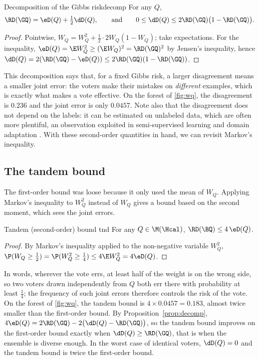 \begin{proposition}{Decomposition of the Gibbs risk}{decomp}
For any $Q$,
\[
\RD(\GQ)=\eD(Q)+\tfrac12\dD(Q),\qquad\text{and}\qquad
0\leq\dD(Q)\leq2\RD(\GQ)\big(1-\RD(\GQ)\big).
\]
\end{proposition}
\begin{proof}
Pointwise, $W_Q=W_Q^2+\frac12\cdot2W_Q(1-W_Q)$; take expectations. For the
inequality, $\eD(Q)=\E W_Q^2\geq(\E W_Q)^2=\RD(\GQ)^2$ by Jensen's inequality, hence
$\dD(Q)=2(\RD(\GQ)-\eD(Q))\leq2\RD(\GQ)(1-\RD(\GQ))$.
\end{proof}

This decomposition says that, for a fixed Gibbs risk, a larger disagreement
means a smaller joint error: the voters make their mistakes on \emph{different}
examples, which is exactly what makes a vote effective. On the forest of
\cref{fig:wq}, the disagreement is $0.236$ and the joint error is only
$0.0457$. Note also that the disagreement does not depend on the labels: it can
be estimated on unlabeled data, which are often more plentiful, an observation
exploited in semi-supervised learning and domain adaptation
\citep{germain2020pac}. With these second-order quantities in hand, we can
revisit Markov's inequality.

\subsection{The tandem bound}

The first-order bound was loose because it only used the mean of $W_Q$.
Applying Markov's inequality to $W_Q^2$ instead of $W_Q$ gives a bound based on
the second moment, which sees the joint errors.

\begin{theorem}{Tandem (second-order) bound \citep{masegosa2020second}}{tnd}
For any $Q\in\M(\Hcal)$, $\RD(\BQ)\leq4\,\eD(Q)$.
\end{theorem}
\begin{proof}
By Markov's inequality applied to the non-negative variable $W_Q^2$,
$\P(W_Q\geq\frac12)=\P(W_Q^2\geq\frac14)\leq4\E W_Q^2=4\eD(Q)$.
\end{proof}

In words, wherever the vote errs, at least half of the weight is on the wrong
side, so two voters drawn independently from $Q$ both err there with probability
at least $\frac14$; the frequency of such joint errors therefore controls the
risk of the vote. On the forest of
\cref{fig:wq}, the tandem bound is $4\times0.0457=0.183$, almost twice smaller
than the first-order bound. By Proposition~\ref{prop:decomp},
$4\eD(Q)=2\RD(\GQ)-2\big(\dD(Q)-\RD(\GQ)\big)$, so the tandem bound improves on
the first-order bound exactly when $\dD(Q)\geq\RD(\GQ)$, that is when the
ensemble is diverse enough. In the worst case of identical voters, $\dD(Q)=0$ and
the tandem bound is twice the first-order bound.

